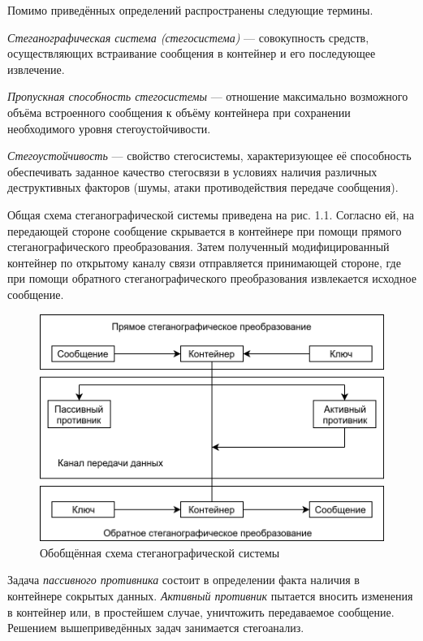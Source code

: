 Помимо приведённых определений распространены следующие термины.

\textit{Стеганографическая система (стегосистема)} --- совокупность средств, осуществляющих встраивание сообщения в контейнер и его последующее извлечение.

\textit{Пропускная способность стегосистемы} --- отношение максимально возможного объёма встроенного сообщения к объёму контейнера при сохранении необходимого уровня стегоустойчивости.

\textit{Стегоустойчивость} --- свойство стегосистемы, характеризующее её способность обеспечивать заданное качество стегосвязи в условиях наличия различных деструктивных факторов (шумы, атаки противодействия передаче сообщения).

Общая схема стеганографической системы приведена на рис. 1.1. Согласно ей, на передающей стороне сообщение скрывается в контейнере при помощи прямого стеганографического преобразования. Затем полученный модифицированный контейнер по открытому каналу связи отправляется принимающей стороне, где при помощи обратного стеганографического преобразования извлекается исходное сообщение.

\begin{figure}
\centering
\includegraphics[width=1\textwidth]{include/graphics/im_1-stego_system}
\caption{Обобщённая схема стеганографической системы}
\label{fig:StegoSystem}
\end{figure}

Задача \textit{пассивного противника} состоит в определении факта наличия в контейнере сокрытых данных. \textit{Активный противник} пытается вносить изменения в контейнер или, в простейшем случае, уничтожить передаваемое сообщение. Решением вышеприведённых задач занимается стегоанализ.

